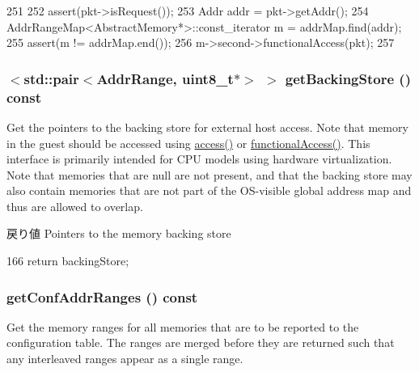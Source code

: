 \begin{DoxyCode}
251 {
252     assert(pkt->isRequest());
253     Addr addr = pkt->getAddr();
254     AddrRangeMap<AbstractMemory*>::const_iterator m = addrMap.find(addr);
255     assert(m != addrMap.end());
256     m->second->functionalAccess(pkt);
257 }
\end{DoxyCode}
\hypertarget{classPhysicalMemory_a57d8785b312d1d1a53c4beb67a019d46}{
\subsubsection[{getBackingStore}]{$<${\bf std::pair}$<${\bf AddrRange}, uint8\_\-t$\ast$$>$ $>$ getBackingStore () const}}
\label{classPhysicalMemory_a57d8785b312d1d1a53c4beb67a019d46}
Get the pointers to the backing store for external host access. Note that memory in the guest should be accessed using \hyperlink{classPhysicalMemory_aac5d96736802cb79fb2287135bcc1dff}{access()} or \hyperlink{classPhysicalMemory_ace845b5316308e12fd958fa5df09a8e8}{functionalAccess()}. This interface is primarily intended for CPU models using hardware virtualization. Note that memories that are null are not present, and that the backing store may also contain memories that are not part of the OS-\/visible global address map and thus are allowed to overlap.

\begin{DoxyReturn}{戻り値}
Pointers to the memory backing store 
\end{DoxyReturn}



\begin{DoxyCode}
166     { return backingStore; }
\end{DoxyCode}
\hypertarget{classPhysicalMemory_a564b079bb27347c8bd8430f009539623}{
\subsubsection[{getConfAddrRanges}]{ getConfAddrRanges () const}}
\label{classPhysicalMemory_a564b079bb27347c8bd8430f009539623}
Get the memory ranges for all memories that are to be reported to the configuration table. The ranges are merged before they are returned such that any interleaved ranges appear as a single range.

